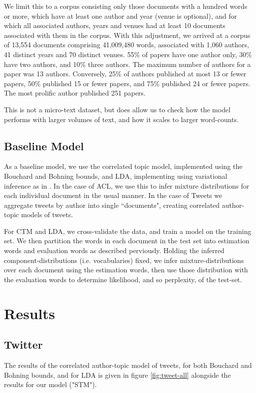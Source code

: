 We limit this to a corpus consisting only those documents with a hundred words or more, which have at least one author and year (venue is optional), and for which all associated authors, years and venues had at least 10 documents associated with them in the corpus. With this adjustment, we arrived at a corpus of 13,554 documents comprising 41,009,480 words, associated with 1,060 authors, 41 distinct years and 70 distinct venues. 55\% of papers have one author only, 30\% have two authors, and 10\% three authors. The maximum number of authors for a paper was 13 authors. Conversely, 25\% of authors published at most 13 or fewer papers, 50\% published 15 or fewer papers, and 75\% published 24 or fewer papers. The most prolific author published 251 papers.

This is not a micro-text dataset, but does allow us to check how the model performs with larger volumes of text, and how it scales to larger word-counts.

\subsection{Baseline Model}
As a baseline model, we use the correlated topic model, implemented using the Bouchard and Bohning bounds, and LDA, implementing using variational inference as in \cite{BleiNgJordan2003}. In the case of ACL, we use this to infer mixture distributions for each individual document in the usual manner. In the case of Tweets we aggregate tweets by author into single ``documents", creating correlated author-topic models of tweets.

For CTM and LDA, we cross-validate the data, and train a model on the training set. We then partition the words in each document in the test set into estimation words and evaluation words as described perviously. Holding the inferred component-distributions (i.e. vocabularies) fixed, we infer mixture-distributions over each document using the estimation words, then use those distribution with the evaluation words to determine likelihood, and so perplexity, of the test-set.

\section{Results}
\subsection*{Twitter}
The results of the correlated author-topic model of tweets, for both Bouchard and Bohning bounds, and for LDA is given in figure \ref{fig:tweet-all} alongside the results for our model ("STM"). 

